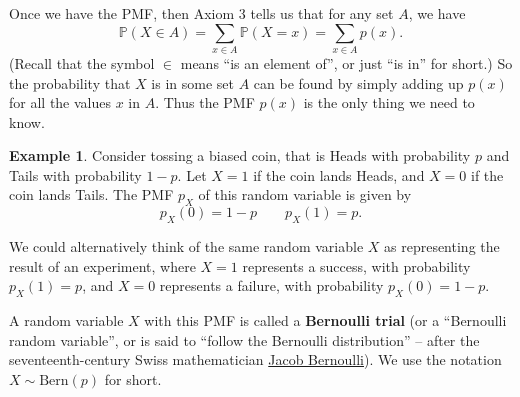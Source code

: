 \documentclass[
  a4paper,
]{book}
\theoremstyle{definition}
\theoremstyle{definition}
\newtheorem{example}{Example}[chapter]
\theoremstyle{definition}
\theoremstyle{definition}
\theoremstyle{remark}
\begin{document}
Once we have the PMF, then Axiom 3 tells us that for any set \(A\), we have
\[ \mathbb P(X \in A) = \sum_{x \in A} \mathbb P(X = x) = \sum_{x \in A} p(x) . \]
(Recall that the symbol \(\in\) means ``is an element of'', or just ``is in'' for short.) So the probability that \(X\) is in some set \(A\) can be found by simply adding up \(p(x)\) for all the values \(x\) in \(A\). Thus the PMF \(p(x)\) is the only thing we need to know.

\begin{example}
Consider tossing a biased coin, that is Heads with probability \(p\) and Tails with probability \(1-p\). Let \(X = 1\) if the coin lands Heads, and \(X = 0\) if the coin lands Tails. The PMF \(p_X\) of this random variable is given by
\[ p_X(0) = 1 - p \qquad p_X(1) = p . \]

We could alternatively think of the same random variable \(X\) as representing the result of an experiment, where \(X = 1\) represents a success, with probability \(p_X(1) = p\), and \(X = 0\) represents a failure, with probability \(p_X(0) = 1 - p\).

A random variable \(X\) with this PMF is called a \textbf{Bernoulli trial} (or a ``Bernoulli random variable'', or is said to ``follow the Bernoulli distribution'' -- after the seventeenth-century Swiss mathematician \href{https://mathshistory.st-andrews.ac.uk/Biographies/Bernoulli_Jacob/}{Jacob Bernoulli}). We use the notation \(X \sim \text{Bern}(p)\) for short.
\end{example}
\end{document}
